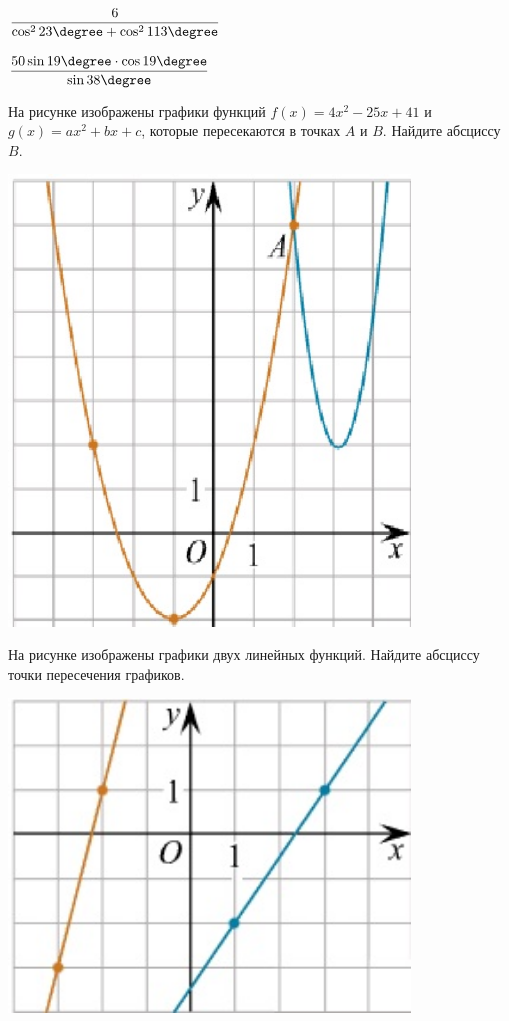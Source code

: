 \begin{listofex}
\begin{enumcols}[itemcolumns=2]
		\item \(\dfrac{6}{\cos^2{23\degree}+\cos^2{113\degree}} \)
		\item \(\dfrac{50\sin{19\degree} \cdot \cos{19\degree}}{\sin{38\degree}} \)
	\end{enumcols}
	\item \begin{minipage}[t]{0.66\textwidth}
		На рисунке изображены графики функций \( f(x)=4x^2-25x+41 \) и \( g(x)=ax^2+bx+c \), которые пересекаются в точках \(A\) и \(B\). Найдите абсциссу  \( B \).
	\end{minipage}
	\begin{minipage}[c]{0.3\textwidth}
		\includegraphics[align=b, width=0.8\textwidth]{../pics/G111M3PP-1}
	\end{minipage}
	\item \begin{minipage}[t]{0.66\textwidth}
		На рисунке изображены графики двух линейных функций. Найдите абсциссу точки пересечения графиков.
	\end{minipage}
	\begin{minipage}[c]{0.3\textwidth}
		\includegraphics[align=b, width=0.8\textwidth]{../pics/G111M3PP-2}
	\end{minipage}
\end{listofex}
